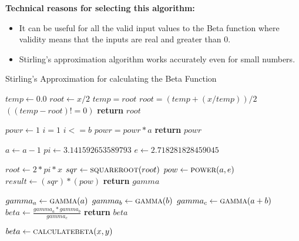 \documentclass{report}
\begin{document}
\textbf{Technical reasons for selecting this algorithm:}
\begin{itemize}
    \item It can be useful for all the valid input values to the Beta function where validity means that the inputs are real and greater than 0.
    \item Stirling's approximation algorithm works accurately even for small numbers.
\end{itemize}

\begin{algorithm}
\caption{Stirling's Approximation for calculating the Beta Function}
\begin{algorithmic}[1]

        \State $temp \leftarrow 0.0$
        \State $root \leftarrow x / 2$
        \Do
        \State $temp = root$
        \State $root = (temp + (x / temp)) / 2$
        \doWhile $((temp - root) != 0)$
        \State \textbf{return} $root $
    \EndProcedure
\Statex

        \State $powr \leftarrow 1$
        \State $i=1$
        \While $i <= b$
        \State $powr = powr* a$
        \EndFor
        \State \textbf{return} $powr$ 
    \EndProcedure
\Statex


        \State $a \leftarrow a - 1$
        \State $pi \leftarrow 3.141592653589793$
        \State $e \leftarrow 2.718281828459045$

        \State $root \leftarrow 2 * pi * x$
        \State $sqr\leftarrow \Call {squareroot}{root}$
        \State $pow \leftarrow \Call {power}{a,e}$
        \State $result \leftarrow (sqr) * (pow)$
        \State \textbf{return} $gamma$
    \EndProcedure
\Statex

    \State $gamma_a \leftarrow \Call{gamma}{a}$
    \State $gamma_b \leftarrow \Call{gamma}{b}$
    \State $gamma_c \leftarrow \Call{gamma}{a+b}$
    \State $beta \leftarrow \frac{gamma_a *gamma_b}{gamma_c}$
    \State \textbf{return} $beta$
    \EndProcedure
\Statex

\State $beta \leftarrow \Call{calculatebeta}{x,y}$

\end{algorithmic}
\end{algorithm}
\end{document}
